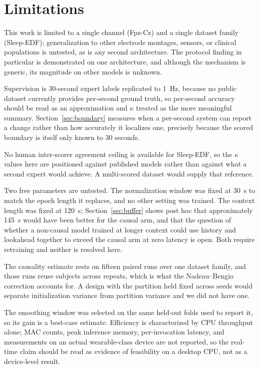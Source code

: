 \documentclass[conference]{IEEEtran}
\begin{document}
\section{Limitations}

This work is limited to a single channel (Fpz-Cz) and a single dataset family (Sleep-EDF); generalization to
other electrode montages, sensors, or clinical populations is untested, as is any second architecture. The
protocol finding in particular is demonstrated on one architecture, and although the mechanism is generic, its
magnitude on other models is unknown.

Supervision is 30-second expert labels replicated to 1~Hz, because no public dataset currently provides
per-second ground truth, so per-second accuracy should be read as an approximation and $\kappa$ treated as the
more meaningful summary. Section~\ref{sec:boundary} measures when a per-second system can report a change
rather than how accurately it localizes one, precisely because the scored boundary is itself only known to 30
seconds.

No human inter-scorer agreement ceiling is available for Sleep-EDF, so the $\kappa$ values here are positioned
against published models rather than against what a second expert would achieve. A multi-scored dataset would
supply that reference.

Two free parameters are untested. The normalization window was fixed at 30~s to match the epoch length it
replaces, and no other setting was trained. The context length was fixed at 120~s;
Section~\ref{sec:buffer} shows post hoc that approximately 145~s would have been better for the causal arm,
and that the question of whether a non-causal model trained at longer context could use history and
lookahead together to exceed the causal arm at zero latency is open. Both require retraining and neither is
resolved here.

The causality estimate rests on fifteen paired runs over one dataset family, and those runs reuse subjects
across repeats, which is what the Nadeau--Bengio correction accounts for. A design with the partition held
fixed across seeds would separate initialization variance from partition variance and we did not have one.

The smoothing window was selected on the same held-out folds used to report it, so its gain is a best-case
estimate. Efficiency is characterized by CPU throughput alone; MAC counts, peak inference memory,
per-invocation latency, and measurements on an actual wearable-class device are not reported, so the real-time
claim should be read as evidence of feasibility on a desktop CPU, not as a device-level result.
\end{document}
